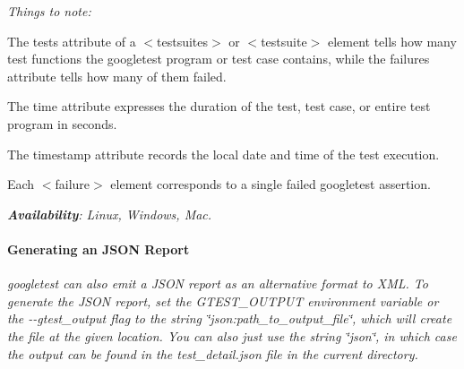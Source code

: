 {\begin{DoxyCode}{0}
\DoxyCodeLine{    </\textcolor{keywordtype}{testcase}>}
\DoxyCodeLine{  </\textcolor{keywordtype}{testsuite}>}
\DoxyCodeLine{  <\textcolor{keywordtype}{testsuite} \textcolor{keyword}{name}=\textcolor{stringliteral}{"LogicTest"} \textcolor{keyword}{tests}=\textcolor{stringliteral}{"1"} \textcolor{keyword}{failures}=\textcolor{stringliteral}{"0"} \textcolor{keyword}{errors}=\textcolor{stringliteral}{"0"} \textcolor{keyword}{time}=\textcolor{stringliteral}{"0.005"}>}
\DoxyCodeLine{    <\textcolor{keywordtype}{testcase} \textcolor{keyword}{name}=\textcolor{stringliteral}{"NonContradiction"} \textcolor{keyword}{status}=\textcolor{stringliteral}{"run"} \textcolor{keyword}{time}=\textcolor{stringliteral}{"0.005"} \textcolor{keyword}{classname}=\textcolor{stringliteral}{""}>}
\DoxyCodeLine{    </\textcolor{keywordtype}{testcase}>}
\DoxyCodeLine{  </\textcolor{keywordtype}{testsuite}>}
\DoxyCodeLine{</\textcolor{keywordtype}{testsuites}>}
\end{DoxyCode}
}

{\itshape Things to note\+:}

{\itshape 
\begin{DoxyItemize}
\item The {\ttfamily tests} attribute of a {\ttfamily $<$testsuites$>$} or {\ttfamily $<$testsuite$>$} element tells how many test functions the googletest program or test case contains, while the {\ttfamily failures} attribute tells how many of them failed.
\item The {\ttfamily time} attribute expresses the duration of the test, test case, or entire test program in seconds.
\item The {\ttfamily timestamp} attribute records the local date and time of the test execution.
\item Each {\ttfamily $<$failure$>$} element corresponds to a single failed googletest assertion.
\end{DoxyItemize}}

{\itshape {\bfseries{Availability}}\+: Linux, Windows, Mac.}

{\itshape \paragraph*{Generating an J\+S\+ON Report}}

{\itshape }

{\itshape googletest can also emit a J\+S\+ON report as an alternative format to X\+ML. To generate the J\+S\+ON report, set the {\ttfamily G\+T\+E\+S\+T\+\_\+\+O\+U\+T\+P\+UT} environment variable or the {\ttfamily -\/-\/gtest\+\_\+output} flag to the string {\ttfamily \char`\"{}json\+:path\+\_\+to\+\_\+output\+\_\+file\char`\"{}}, which will create the file at the given location. You can also just use the string {\ttfamily \char`\"{}json\char`\"{}}, in which case the output can be found in the {\ttfamily test\+\_\+detail.\+json} file in the current directory.}

